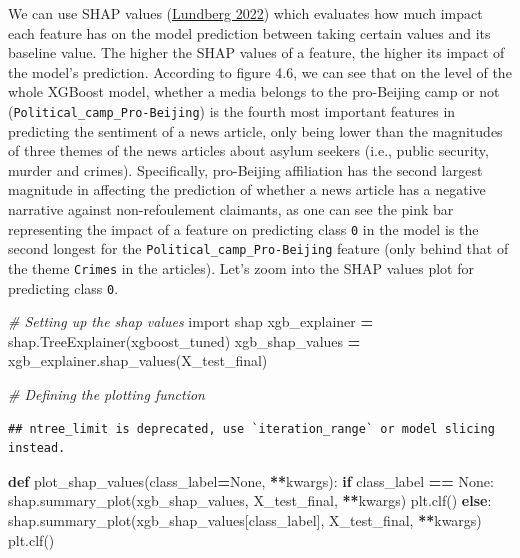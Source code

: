 \documentclass[a4paper, oneside]{report}
\newenvironment{Shaded}{\begin{snugshade}}{\end{snugshade}}
\newcommand{\CommentTok}[1]{\textcolor[rgb]{0.56,0.35,0.01}{\textit{#1}}}
\newcommand{\ControlFlowTok}[1]{\textcolor[rgb]{0.13,0.29,0.53}{\textbf{#1}}}
\newcommand{\ImportTok}[1]{#1}
\newcommand{\KeywordTok}[1]{\textcolor[rgb]{0.13,0.29,0.53}{\textbf{#1}}}
\newcommand{\NormalTok}[1]{#1}
\newcommand{\OperatorTok}[1]{\textcolor[rgb]{0.81,0.36,0.00}{\textbf{#1}}}
\newcommand{\VariableTok}[1]{\textcolor[rgb]{0.00,0.00,0.00}{#1}}
\renewenvironment{Shaded}
{
  \vspace{4pt}%
  \begin{snugshade}%
}{%
  \end{snugshade}%
  \vspace{4pt}%
}
\begin{document}
We can use SHAP values
(\protect\hyperlink{ref-lundbergSlundbergShap2022}{Lundberg 2022}) which
evaluates how much impact each feature has on the model prediction
between taking certain values and its baseline value. The higher the
SHAP values of a feature, the higher its impact of the model's
prediction. According to figure 4.6, we can see that on the level of the
whole XGBoost model, whether a media belongs to the pro-Beijing camp or
not (\texttt{Political\_camp\_Pro-Beijing}) is the fourth most important
features in predicting the sentiment of a news article, only being lower
than the magnitudes of three themes of the news articles about asylum
seekers (i.e., public security, murder and crimes). Specifically,
pro-Beijing affiliation has the second largest magnitude in affecting
the prediction of whether a news article has a negative narrative
against non-refoulement claimants, as one can see the pink bar
representing the impact of a feature on predicting class \texttt{0} in
the model is the second longest for the
\texttt{Political\_camp\_Pro-Beijing} feature (only behind that of the
theme \texttt{Crimes} in the articles). Let's zoom into the SHAP values
plot for predicting class \texttt{0}.

\begin{Shaded}
\begin{Highlighting}[]
\CommentTok{\# Setting up the shap values }
\ImportTok{import}\NormalTok{ shap}
\NormalTok{xgb\_explainer }\OperatorTok{=}\NormalTok{ shap.TreeExplainer(xgboost\_tuned)}
\NormalTok{xgb\_shap\_values }\OperatorTok{=}\NormalTok{ xgb\_explainer.shap\_values(X\_test\_final)}

\CommentTok{\# Defining the plotting function}
\end{Highlighting}
\end{Shaded}

\begin{verbatim}
## ntree_limit is deprecated, use `iteration_range` or model slicing instead.
\end{verbatim}

\begin{Shaded}
\begin{Highlighting}[]
\KeywordTok{def}\NormalTok{ plot\_shap\_values(class\_label}\OperatorTok{=}\VariableTok{None}\NormalTok{, }\OperatorTok{**}\NormalTok{kwargs):}
  \ControlFlowTok{if}\NormalTok{ class\_label }\OperatorTok{==} \VariableTok{None}\NormalTok{:}
\NormalTok{    shap.summary\_plot(xgb\_shap\_values, X\_test\_final, }\OperatorTok{**}\NormalTok{kwargs)}
\NormalTok{    plt.clf()}
  \ControlFlowTok{else}\NormalTok{:}
\NormalTok{    shap.summary\_plot(xgb\_shap\_values[class\_label], X\_test\_final, }\OperatorTok{**}\NormalTok{kwargs)}
\NormalTok{    plt.clf()}
    
\end{Highlighting}
\end{Shaded}
\end{document}
